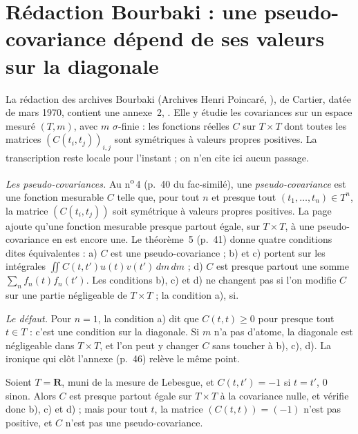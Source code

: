 \section[Rédaction Bourbaki \redac{551} : une pseudo-covariance dépend de la diagonale]{Rédaction Bourbaki  : une pseudo-covariance dépend de ses valeurs sur la diagonale\protect\piste\protect{}}\label{sec:bourbaki-551}

La rédaction  des archives Bourbaki (Archives Henri Poincaré, ), de Cartier, datée de mars 1970, contient une annexe~2, . Elle y étudie les covariances sur un espace mesuré $(T, m)$, avec $m$ $\sigma$-finie : les fonctions réelles $C$ sur $T \times T$ dont toutes les matrices $(C(t_i, t_j))_{i,j}$ sont symétriques à valeurs propres positives. La transcription reste locale pour l'instant ; on n'en cite ici aucun passage.

\emph{Les pseudo-covariances.} Au n\textsuperscript{o}\,4 (p.~40 du fac-similé), une \emph{pseudo-covariance} est une fonction mesurable $C$ telle que, pour tout $n$ et presque tout $(t_1, \dots, t_n) \in T^n$, la matrice $(C(t_i, t_j))$ soit symétrique à valeurs propres positives. La page ajoute qu'une fonction mesurable presque partout égale, sur $T \times T$, à une pseudo-covariance en est encore une. Le théorème~5 (p.~41) donne quatre conditions dites équivalentes : a) $C$ est une pseudo-covariance ; b) et c) portent sur les intégrales $\iint C(t,t')u(t)v(t')\,dm\,dm$ ; d) $C$ est presque partout une somme $\sum_n f_n(t) f_n(t')$. Les conditions b), c) et d) ne changent pas si l'on modifie $C$ sur une partie négligeable de $T \times T$ ; la condition a), si.

\emph{Le défaut.} Pour $n = 1$, la condition a) dit que $C(t, t) \ge 0$ pour presque tout $t \in T$ : c'est une condition sur la diagonale. Si $m$ n'a pas d'atome, la diagonale est négligeable dans $T \times T$, et l'on peut y changer $C$ sans toucher à b), c), d). La  ironique qui clôt l'annexe (p.~46) relève le même point.

\begin{encadre}
\begin{contrexemple}
Soient $T = \mathbf R$, muni de la mesure de Lebesgue, et $C(t, t') = -1$ si $t = t'$, $0$ sinon. Alors $C$ est presque partout égale sur $T \times T$ à la covariance nulle, et vérifie donc b), c) et d) ; mais pour tout $t$, la matrice $(C(t,t)) = (-1)$ n'est pas positive, et $C$ n'est pas une pseudo-covariance.
\end{contrexemple}
\end{encadre}

